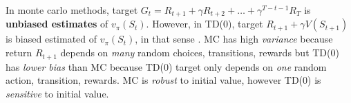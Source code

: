 \documentclass[
	10pt, %
]{article}
\newcommand{\mbb}[1]{\mathbb{#1}}
\newcommand{\tb}[1]{\textbf{#1}}
\newcommand{\ti}[1]{\textit{#1}}
\numberwithin{equation}{subsection} %
\begin{document}
In monte carlo methods, target $G_t=R_{t+1}+\gamma R_{t+2}+ \dots + \gamma^{T-t-1}R_T$ is \tb{unbiased estimates} of $v_\pi(S_t)$. However, in TD(0), target $R_{t+1}+\gamma V(S_{t+1})$ is biased estimated of $v_\pi(S_t)$, in that sense \bm{$\mbb{E}[R_{t+1} + \gamma V(S_{t+1})|S_t] \neq \mbb{E}[G_{t+1}|S_t] = v_\pi(S_t)$}. MC has high \ti{variance} because return $R_{t+1}$ depends on \ti{many} random choices, transitions, rewards but TD(0) has \ti{lower bias} than MC because TD(0) target only depends on \ti{one} random action, transition, rewards. MC is \ti{robust} to initial value, however TD(0) is \ti{sensitive} to initial value.
\end{document}
